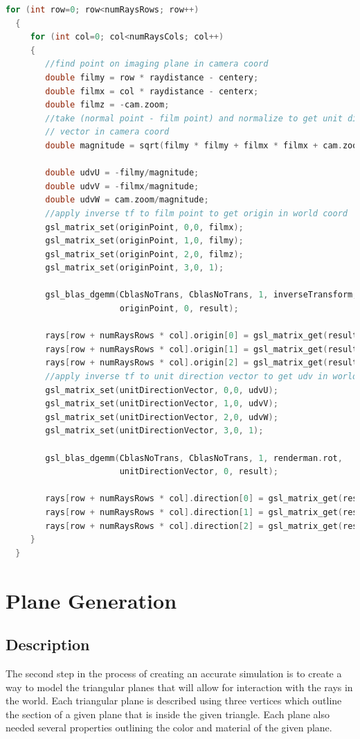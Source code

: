 \documentclass{article}
\begin{document}
\begin{lstlisting}[language=C]
  for (int row=0; row<numRaysRows; row++)
  {
     for (int col=0; col<numRaysCols; col++)
     {
        //find point on imaging plane in camera coord
        double filmy = row * raydistance - centery;
        double filmx = col * raydistance - centerx;
        double filmz = -cam.zoom;
        //take (normal point - film point) and normalize to get unit direction 
        // vector in camera coord
        double magnitude = sqrt(filmy * filmy + filmx * filmx + cam.zoom*cam.zoom);
        
        double udvU = -filmy/magnitude;
        double udvV = -filmx/magnitude;
        double udvW = cam.zoom/magnitude;
        //apply inverse tf to film point to get origin in world coord
        gsl_matrix_set(originPoint, 0,0, filmx);
        gsl_matrix_set(originPoint, 1,0, filmy);
        gsl_matrix_set(originPoint, 2,0, filmz);
        gsl_matrix_set(originPoint, 3,0, 1);

        gsl_blas_dgemm(CblasNoTrans, CblasNoTrans, 1, inverseTransform, 
                       originPoint, 0, result);
        
        rays[row + numRaysRows * col].origin[0] = gsl_matrix_get(result, 0,0);
        rays[row + numRaysRows * col].origin[1] = gsl_matrix_get(result, 1,0);
        rays[row + numRaysRows * col].origin[2] = gsl_matrix_get(result, 2,0);
        //apply inverse tf to unit direction vector to get udv in world coord
        gsl_matrix_set(unitDirectionVector, 0,0, udvU);
        gsl_matrix_set(unitDirectionVector, 1,0, udvV);
        gsl_matrix_set(unitDirectionVector, 2,0, udvW);
        gsl_matrix_set(unitDirectionVector, 3,0, 1);

        gsl_blas_dgemm(CblasNoTrans, CblasNoTrans, 1, renderman.rot, 
                       unitDirectionVector, 0, result);

        rays[row + numRaysRows * col].direction[0] = gsl_matrix_get(result, 0,0);
        rays[row + numRaysRows * col].direction[1] = gsl_matrix_get(result, 1,0);
        rays[row + numRaysRows * col].direction[2] = gsl_matrix_get(result, 2,0);
     }
  }
\end{lstlisting}

\section{Plane Generation}
\subsection{Description}
The second step in the process of creating an accurate simulation is to create a way to model the triangular planes
that will allow for interaction with the rays in the world. Each triangular plane is described using three vertices
which outline the section of a given plane that is inside the given triangle. Each plane also needed several properties
outlining the color and material of the given plane.
\end{document}
